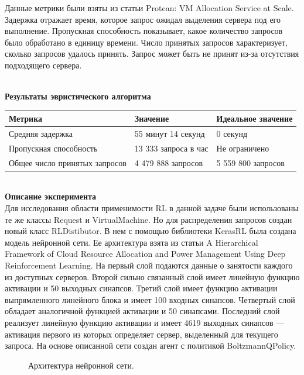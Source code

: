 \documentclass{article}
\begin{document}
Данные метрики были взяты из статьи Protean: VM Allocation Service at Scale\cite{litlink21}. Задержка отражает время, которое запрос ожидал выделения сервера под его выполнение. Пропускная способность показывает, какое количество запросов было обработано в единицу времени. Число принятых запросов характеризует, сколько запросов удалось принять. Запрос может быть не принят из-за отсутствия подходящего сервера.\\
~\\
\begin{center}
\textbf{Результаты эвристического алгоритма}\\
\begin{tabular}{ | l | l | l | }
\hline
Метрика & Значение & Идеальное значение\\ \hline
Средняя задержка & 55 минут 14 секунд & 0 секунд \\
Пропускная способность & 13 333 запроса в час & Не ограничено \\
Общее число принятых запросов & 4 479 888 запросов & 5 559 800 запросов \\
\hline
\end{tabular}
\end{center}
~\\
\textbf{Описание эксперимента}\\
Для исследования области применимости RL в данной задаче были использованы те же классы Request и VirtualMachine. Но для распределения запросов создан новый класс RLDistibutor. В нем с помощью библиотеки KerasRL была создана модель нейронной сети. Ее архитектура взята из статьи A Hierarchical Framework of Cloud Resource Allocation and Power Management Using Deep Reinforcement Learning\cite{litlink24}. На первый слой подаются данные о занятости каждого из доступных серверов. Второй сильно связанный слой имеет линейную функцию активации и 50 выходных синапсов. Третий слой имеет функцию активации выпрямленного линейного блока и имеет 100 входных синапсов. Четвертый слой обладает аналогичной функцией активации и 50 синапсами. Последний слой реализует линейную функцию активации и имеет 4619 выходных синапсов — активация первого из которых определяет сервер, выделенный для текущего запроса. На основе описанной сети создан агент с политикой BoltzmannQPolicy.\\
\begin{figure}[h!]
\caption{Архитектура нейронной сети.}
\label{ris:image}
\end{figure}\\
\end{document}
